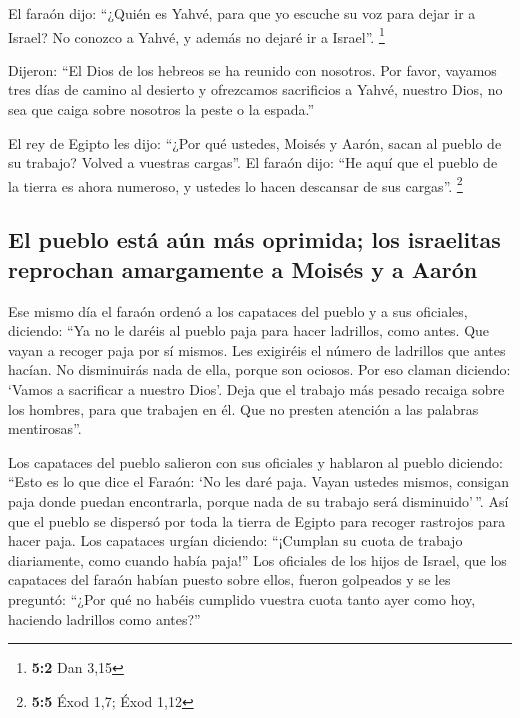  El faraón dijo: ``¿Quién es Yahvé, para que yo escuche su
voz para dejar ir a Israel? No conozco a Yahvé, y además no dejaré ir a
Israel''. \footnote{\textbf{5:2} Dan 3,15}

 Dijeron: ``El Dios de los hebreos se ha reunido con
nosotros. Por favor, vayamos tres días de camino al desierto y
ofrezcamos sacrificios a Yahvé, nuestro Dios, no sea que caiga sobre
nosotros la peste o la espada.''

 El rey de Egipto les dijo: ``¿Por qué ustedes, Moisés y
Aarón, sacan al pueblo de su trabajo? Volved a vuestras cargas''.
 El faraón dijo: ``He aquí que el pueblo de la tierra es
ahora numeroso, y ustedes lo hacen descansar de sus cargas''.
\footnote{\textbf{5:5} Éxod 1,7; Éxod 1,12}

\hypertarget{el-pueblo-estuxe1-auxfan-muxe1s-oprimida-los-israelitas-reprochan-amargamente-a-moisuxe9s-y-a-aaruxf3n}{%
\subsection{El pueblo está aún más oprimida; los israelitas reprochan
amargamente a Moisés y a
Aarón}\label{el-pueblo-estuxe1-auxfan-muxe1s-oprimida-los-israelitas-reprochan-amargamente-a-moisuxe9s-y-a-aaruxf3n}}

 Ese mismo día el faraón ordenó a los capataces del pueblo
y a sus oficiales, diciendo:  ``Ya no le daréis al pueblo
paja para hacer ladrillos, como antes. Que vayan a recoger paja por sí
mismos.  Les exigiréis el número de ladrillos que antes
hacían. No disminuirás nada de ella, porque son ociosos. Por eso claman
diciendo: `Vamos a sacrificar a nuestro Dios'.  Deja que
el trabajo más pesado recaiga sobre los hombres, para que trabajen en
él. Que no presten atención a las palabras mentirosas''.

 Los capataces del pueblo salieron con sus oficiales y
hablaron al pueblo diciendo: ``Esto es lo que dice el Faraón: `No les
daré paja.  Vayan ustedes mismos, consigan paja donde
puedan encontrarla, porque nada de su trabajo será disminuido'\,''.
 Así que el pueblo se dispersó por toda la tierra de
Egipto para recoger rastrojos para hacer paja.  Los
capataces urgían diciendo: ``¡Cumplan su cuota de trabajo diariamente,
como cuando había paja!''  Los oficiales de los hijos de
Israel, que los capataces del faraón habían puesto sobre ellos, fueron
golpeados y se les preguntó: ``¿Por qué no habéis cumplido vuestra cuota
tanto ayer como hoy, haciendo ladrillos como antes?''

